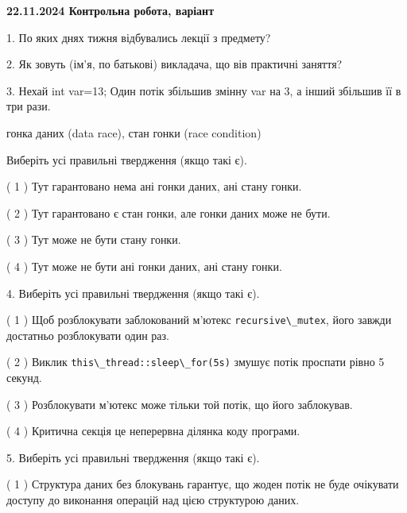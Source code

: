 \documentclass[12pt, ukrainian]{article}
\def\code#1{\Verb!#1!}
\begin{document}
\vspace{4mm}
\newpage
\begin {large}

\textbf{22.11.2024 Контрольна робота, варіант  }\par


{
1. По яких днях тижня відбувались лекції з предмету?



\vspace{5mm}
2. Як зовуть (ім'я, по батькові) викладача, що вів практичні заняття?



\vspace{5mm}
3. Нехай int var=13; Один потік збільшив змінну var на 3, а інший збільшив її в три рази.

гонка даних (data race), стан гонки (race condition)

Виберіть усі правильні твердження (якщо такі є).\par
\vspace{2mm}
( 1 ) Тут гарантовано нема ані гонки даних, ані стану гонки.%

( 2 ) Тут гарантовано є стан гонки, але гонки даних може не бути.%

( 3 ) Тут може не бути стану гонки.%

( 4 ) Тут може не бути ані гонки даних, ані стану гонки.%


\vspace{5mm}
4. Виберіть усі правильні твердження (якщо такі є).\par
\vspace{2mm}

( 1 ) Щоб розблокувати заблокований м’ютекс \code{recursive\_mutex}, його завжди достатньо розблокувати один раз.%

( 2 ) Виклик \code{this\_thread::sleep\_for(5s)} змушує потік проспати рівно 5 секунд.%

( 3 ) Розблокувати м’ютекс може тільки той потік, що його заблокував.%

( 4 ) Критична секція це неперервна ділянка коду програми.%


\vspace{5mm}
5. Виберіть усі правильні твердження (якщо такі є).\par
\vspace{2mm}

( 1 ) Структура даних без блокувань гарантує, що жоден потік не буде очікувати доступу до виконання операцій над цією структурою даних.%

}
\end{large}
\end{document}

